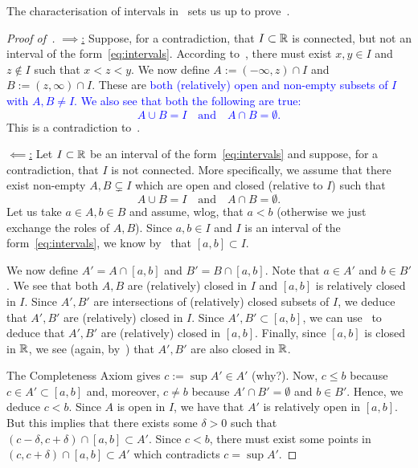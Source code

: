 The characterisation of intervals in~ sets us up to prove~.
\begin{proof}[Proof of~]
	\ul{$\implies$:} Suppose, for a contradiction, that $I\subset \mathbb{R}$ is connected, but not an interval of the form~\eqref{eq:intervals}. According to~, there must exist $x,y\in I$ and $z \notin I$ such that $x < z < y$. We now define $A:= (-\infty,z) \cap I$ and $B:= (z,\infty) \cap I$. These are \textcolor{blue}{both (relatively) open and non-empty subsets of $I$ with $A,B\neq I$. We also see that both the following are true:
	\[
	A \cup B = I\quad\text{and}\quad A\cap B = \emptyset.
	\]
}
	This is a contradiction to~.
	
	\ul{$\impliedby$:} Let $I\subset \mathbb{R}$ be an interval of the form~\eqref{eq:intervals} and suppose, for a contradiction, that $I$ is not connected. More specifically, we assume that there exist non-empty $A,B\subsetneq I$ which are open and closed (relative to $I$) such that
	\[
	A\cup B = I\quad\text{and}\quad A\cap B = \emptyset.
	\]
	Let us take $a\in A, b\in B$ and assume, wlog, that $a<b$ (otherwise we just exchange the roles of $A,B$). Since $a,b\in I$ and $I$ is an interval of the form~\eqref{eq:intervals}, we know by~ that $[a,b] \subset I$.
	
	We now define $A' = A\cap [a,b]$ and $B' = B \cap [a,b]$. Note that $a\in A'$ and $b\in B'$. We see that both $A,B$ are (relatively) closed in $I$ and $[a,b]$ is relatively closed in $I$. Since $A',B'$ are intersections of (relatively) closed subsets of $I$, we deduce that $A',B'$ are (relatively) closed in $I$. Since $A',B'\subset [a,b]$, we can use~ to deduce that $A',B'$ are (relatively) closed in $[a,b]$. Finally, since $[a,b]$ is closed in $\mathbb{R}$, we see (again, by~) that $A',B'$ are also closed in $\mathbb{R}$. 
	
The Completeness Axiom gives $c:=\sup A' \in A'$ (why?). Now, $c \le b$ because $c \in A' \subset [a,b]$ and, moreover, $c \neq b$ because $A' \cap B' = \emptyset$ and $b \in B'$. Hence, we deduce $c < b$. Since $A$ is open in $I$, we have that $A'$ is relatively open in $[a,b]$. But this implies that there exists some $\delta>0$ such that $(c-\delta,c+\delta)\cap [a,b] \subset A'$. Since $c < b$, there must exist some points in $(c,c+\delta)\cap [a,b]\subset A'$ which contradicts $c = \sup A'$.
\end{proof}